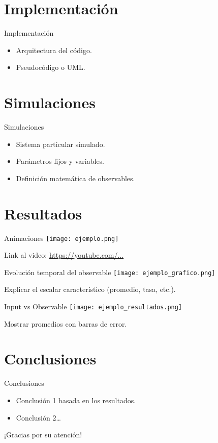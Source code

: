 \documentclass{beamer}
\begin{document}
\section{Implementación}
\begin{frame}{Implementación}
  \begin{itemize}
    \item Arquitectura del código.
    \item Pseudocódigo o UML.
  \end{itemize}
\end{frame}

\section{Simulaciones}
\begin{frame}{Simulaciones}
  \begin{itemize}
    \item Sistema particular simulado.
    \item Parámetros fijos y variables.
    \item Definición matemática de observables.
  \end{itemize}
\end{frame}

\section{Resultados}
\begin{frame}{Animaciones}
  \texttt{[image: ejemplo.png]}
  
  \vspace{0.3cm}
  \footnotesize Link al video: \url{https://youtube.com/...}
\end{frame}

\begin{frame}{Evolución temporal del observable}
  \texttt{[image: ejemplo\_grafico.png]}
  
  \vspace{0.3cm}
  Explicar el escalar característico (promedio, tasa, etc.).
\end{frame}

\begin{frame}{Input vs Observable}
  \texttt{[image: ejemplo\_resultados.png]}
  
  \vspace{0.3cm}
  Mostrar promedios con barras de error.
\end{frame}

\section{Conclusiones}
\begin{frame}{Conclusiones}
  \begin{itemize}
    \item Conclusión 1 basada en los resultados.
    \item Conclusión 2…
  \end{itemize}
\end{frame}

\begin{frame}{}
  \centering
  \Huge ¡Gracias por su atención!
\end{frame}
\end{document}
